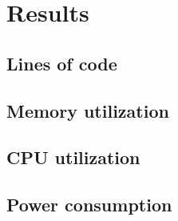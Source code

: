 \chapter{Results}

\section{Lines of code}

\section{Memory utilization}
 
\section{CPU utilization}
 
\section{Power consumption}